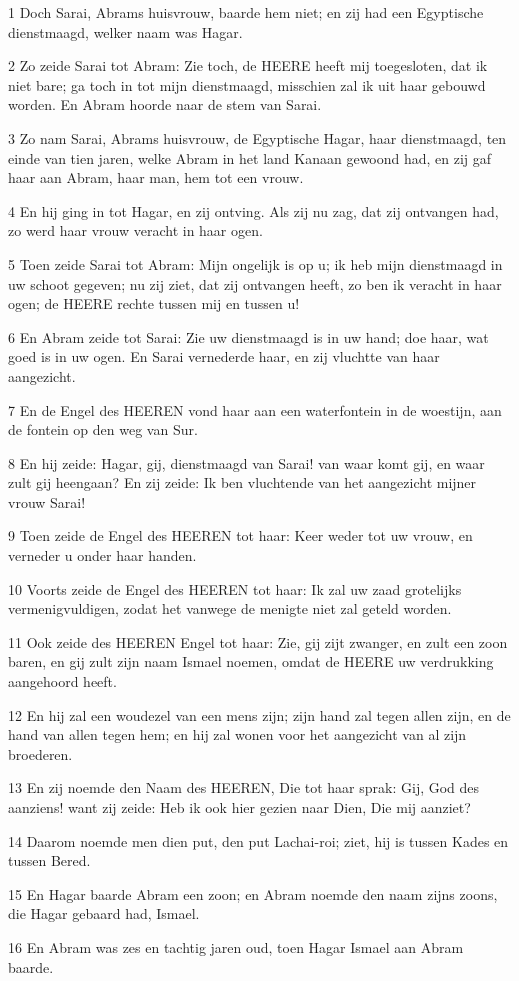 \par 1 Doch Sarai, Abrams huisvrouw, baarde hem niet; en zij had een Egyptische dienstmaagd, welker naam was Hagar.
\par 2 Zo zeide Sarai tot Abram: Zie toch, de HEERE heeft mij toegesloten, dat ik niet bare; ga toch in tot mijn dienstmaagd, misschien zal ik uit haar gebouwd worden. En Abram hoorde naar de stem van Sarai.
\par 3 Zo nam Sarai, Abrams huisvrouw, de Egyptische Hagar, haar dienstmaagd, ten einde van tien jaren, welke Abram in het land Kanaan gewoond had, en zij gaf haar aan Abram, haar man, hem tot een vrouw.
\par 4 En hij ging in tot Hagar, en zij ontving. Als zij nu zag, dat zij ontvangen had, zo werd haar vrouw veracht in haar ogen.
\par 5 Toen zeide Sarai tot Abram: Mijn ongelijk is op u; ik heb mijn dienstmaagd in uw schoot gegeven; nu zij ziet, dat zij ontvangen heeft, zo ben ik veracht in haar ogen; de HEERE rechte tussen mij en tussen u!
\par 6 En Abram zeide tot Sarai: Zie uw dienstmaagd is in uw hand; doe haar, wat goed is in uw ogen. En Sarai vernederde haar, en zij vluchtte van haar aangezicht.
\par 7 En de Engel des HEEREN vond haar aan een waterfontein in de woestijn, aan de fontein op den weg van Sur.
\par 8 En hij zeide: Hagar, gij, dienstmaagd van Sarai! van waar komt gij, en waar zult gij heengaan? En zij zeide: Ik ben vluchtende van het aangezicht mijner vrouw Sarai!
\par 9 Toen zeide de Engel des HEEREN tot haar: Keer weder tot uw vrouw, en verneder u onder haar handen.
\par 10 Voorts zeide de Engel des HEEREN tot haar: Ik zal uw zaad grotelijks vermenigvuldigen, zodat het vanwege de menigte niet zal geteld worden.
\par 11 Ook zeide des HEEREN Engel tot haar: Zie, gij zijt zwanger, en zult een zoon baren, en gij zult zijn naam Ismael noemen, omdat de HEERE uw verdrukking aangehoord heeft.
\par 12 En hij zal een woudezel van een mens zijn; zijn hand zal tegen allen zijn, en de hand van allen tegen hem; en hij zal wonen voor het aangezicht van al zijn broederen.
\par 13 En zij noemde den Naam des HEEREN, Die tot haar sprak: Gij, God des aanziens! want zij zeide: Heb ik ook hier gezien naar Dien, Die mij aanziet?
\par 14 Daarom noemde men dien put, den put Lachai-roi; ziet, hij is tussen Kades en tussen Bered.
\par 15 En Hagar baarde Abram een zoon; en Abram noemde den naam zijns zoons, die Hagar gebaard had, Ismael.
\par 16 En Abram was zes en tachtig jaren oud, toen Hagar Ismael aan Abram baarde.

